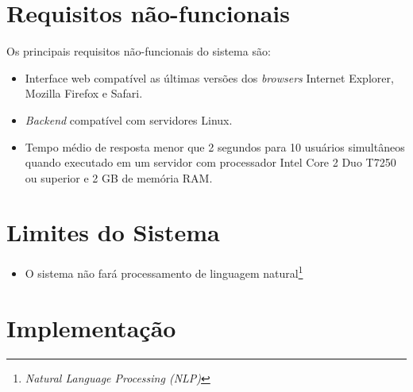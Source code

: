 \section{Requisitos não-funcionais}

Os principais requisitos não-funcionais do sistema são:

\begin{itemize}

    \item Interface web compatível as últimas versões dos \textit{browsers} Internet Explorer, Mozilla Firefox e Safari.
    
    \item \textit{Backend} compatível com servidores Linux.

    \item Tempo médio de resposta menor que 2 segundos para 10 usuários simultâneos quando executado em um servidor com processador Intel Core 2 Duo T7250 ou superior e 2 GB de memória RAM. %

\end{itemize}

\section{Limites do Sistema}

\begin{itemize}
  
    \item O sistema não fará processamento de linguagem natural\footnote{\textit{Natural Language Processing (NLP)}}

\end{itemize}

\section{Implementação} %
\label{sec:implementacao}



